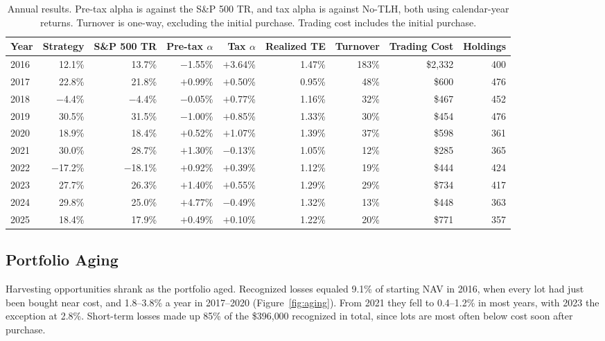 \begin{table}[!h]
\caption{Annual results. Pre-tax alpha is against the S\&P 500 TR, and tax alpha is against No-TLH, both using calendar-year returns. Turnover is one-way, excluding the initial purchase. Trading cost includes the initial purchase.}
\label{tab:annual}
\small
\begin{tabularx}{\linewidth}{@{}Xrrrrrrrr@{}}
\toprule
\textsf{\textbf{Year}} & \textsf{\textbf{Strategy}} & \textsf{\textbf{S\&P 500 TR}} & \textsf{\textbf{Pre-tax $\alpha$}} & \textsf{\textbf{Tax $\alpha$}} & \textsf{\textbf{Realized TE}} & \textsf{\textbf{Turnover}} & \textsf{\textbf{Trading Cost}} & \textsf{\textbf{Holdings}} \\
\midrule
2016 & 12.1\% & 13.7\% & $-$1.55\% & $+$3.64\% & 1.47\% & 183\% & \$2{,}332 & 400 \\
2017 & 22.8\% & 21.8\% & $+$0.99\% & $+$0.50\% & 0.95\% & 48\% & \$600 & 476 \\
2018 & $-$4.4\% & $-$4.4\% & $-$0.05\% & $+$0.77\% & 1.16\% & 32\% & \$467 & 452 \\
2019 & 30.5\% & 31.5\% & $-$1.00\% & $+$0.85\% & 1.33\% & 30\% & \$454 & 476 \\
2020 & 18.9\% & 18.4\% & $+$0.52\% & $+$1.07\% & 1.39\% & 37\% & \$598 & 361 \\
2021 & 30.0\% & 28.7\% & $+$1.30\% & $-$0.13\% & 1.05\% & 12\% & \$285 & 365 \\
2022 & $-$17.2\% & $-$18.1\% & $+$0.92\% & $+$0.39\% & 1.12\% & 19\% & \$444 & 424 \\
2023 & 27.7\% & 26.3\% & $+$1.40\% & $+$0.55\% & 1.29\% & 29\% & \$734 & 417 \\
2024 & 29.8\% & 25.0\% & $+$4.77\% & $-$0.49\% & 1.32\% & 13\% & \$448 & 363 \\
2025 & 18.4\% & 17.9\% & $+$0.49\% & $+$0.10\% & 1.22\% & 20\% & \$771 & 357 \\
\bottomrule
\end{tabularx}
\end{table}

\subsection{Portfolio Aging}
\label{sec:aging}

Harvesting opportunities shrank as the portfolio aged. Recognized losses equaled 9.1\% of starting NAV in 2016, when every lot had just been bought near cost, and 1.8--3.8\% a year in 2017--2020 (Figure~\ref{fig:aging}). From 2021 they fell to 0.4--1.2\% in most years, with 2023 the exception at 2.8\%. Short-term losses made up 85\% of the \$396{,}000 recognized in total, since lots are most often below cost soon after purchase.

